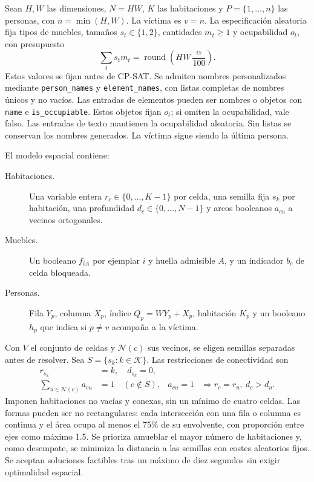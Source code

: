 \documentclass[11pt,a4paper]{article}
\begin{document}
Sean $H,W$ las dimensiones, $N=HW$, $K$ las habitaciones y
$P=\{1,\ldots,n\}$ las personas, con $n=\min(H,W)$. La v\'ictima
es $v=n$. La especificaci\'on aleatoria fija tipos de muebles,
tama\~nos $s_t\in\{1,2\}$, cantidades $m_t\geq1$ y ocupabilidad $o_t$,
con presupuesto
\[
 \sum_t s_tm_t
   =\operatorname{round}\left(HW\,\frac{\alpha}{100}\right).
\]
Estos valores se fijan antes de CP-SAT.
Se admiten nombres personalizados mediante \texttt{person\_names}
y \texttt{element\_names}, con listas completas de nombres \'unicos
y no vac\'ios. Las entradas de elementos pueden ser nombres o
objetos con \texttt{name} e \texttt{is\_occupiable}. Estos objetos
fijan $o_t$; si omiten la ocupabilidad, vale falso. Las entradas de
texto mantienen la ocupabilidad aleatoria. Sin listas se conservan
los nombres generados. La v\'ictima sigue siendo la \'ultima persona.

El modelo espacial contiene:
\begin{description}
  \item[Habitaciones.] Una variable entera $r_c\in\{0,\ldots,K-1\}$
        por celda, una semilla fija $s_k$ por habitaci\'on,
        una profundidad $d_c\in\{0,\ldots,N-1\}$ y arcos
        booleanos $a_{cu}$ a vecinos ortogonales.
  \item[Muebles.] Un booleano $f_{iA}$ por ejemplar $i$ y huella
        admisible $A$, y un indicador $b_c$ de celda bloqueada.
  \item[Personas.] Fila $Y_p$, columna $X_p$, \'indice
        $Q_p=WY_p+X_p$, habitaci\'on $K_p$ y un booleano $h_p$
        que indica si $p\neq v$ acompa\~na a la v\'ictima.
\end{description}

Con $V$ el conjunto de celdas y $\mathcal N(c)$ sus vecinos,
se eligen semillas separadas antes de resolver. Sea
$S=\{s_k:k\in\mathcal K\}$. Las restricciones de conectividad son
\begin{align*}
 r_{s_k}&=k,\quad d_{s_k}=0,\\
 \sum_{u\in\mathcal N(c)}a_{cu}&=1\quad(c\notin S),&
 a_{cu}=1&\Longrightarrow r_c=r_u,\ d_c>d_u.
\end{align*}
Imponen habitaciones no vac\'ias y conexas, sin un m\'inimo de
cuatro celdas.
Las formas pueden ser no rectangulares: cada intersecci\'on con
una fila o columna es continua y el \'area ocupa al menos el 75\%
de su envolvente, con proporci\'on entre ejes como m\'aximo 1.5.
Se prioriza amueblar el mayor n\'umero de habitaciones y, como
desempate, se minimiza la distancia a las semillas con costes
aleatorios fijos. Se aceptan soluciones factibles tras un m\'aximo
de diez segundos sin exigir optimalidad espacial.
\end{document}
